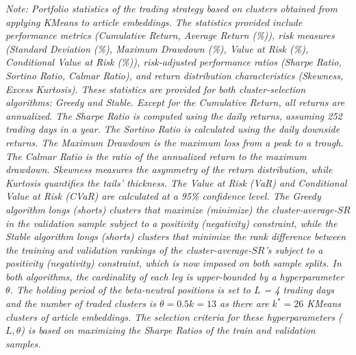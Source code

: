 \begin{table}[H]
\begin{minipage}{\textwidth}
\small\textit{Note: 
Portfolio statistics of the trading strategy based on clusters obtained from applying KMeans to article embeddings. 
The statistics provided include performance metrics (Cumulative Return, Average Return (\%)), risk measures (Standard Deviation (\%), Maximum Drawdown (\%), Value at Risk (\%), Conditional Value at Risk (\%)), risk-adjusted performance ratios (Sharpe Ratio, Sortino Ratio, Calmar Ratio), and return distribution characteristics (Skewness, Excess Kurtosis). These statistics are provided for both cluster-selection algorithms: Greedy and Stable. 
Except for the Cumulative Return, all returns are annualized. The Sharpe Ratio is computed using the daily returns, assuming 252 trading days in a year. The Sortino Ratio is calculated using the daily downside returns. The Maximum Drawdown is the maximum loss from a peak to a trough. The Calmar Ratio is the ratio of the annualized return to the maximum drawdown. Skewness measures the asymmetry of the return distribution, while Kurtosis quantifies the tails' thickness. The Value at Risk (VaR) and Conditional Value at Risk (CVaR) are calculated at a 95\% confidence level.
The Greedy algorithm longs (shorts) clusters that maximize (minimize) the cluster-average-$SR$ in the validation sample subject to a positivity (negativity) constraint, while the Stable algorithm longs (shorts) clusters that minimize the rank difference between the training and validation rankings of the cluster-average-$SR$'s subject to a positivity (negativity) constraint, which is now imposed on both sample splits. In both algorithms, the cardinality of each leg is upper-bounded by a hyperparameter $\theta$. 
The holding period of the beta-neutral positions is set to $L$ = 4 trading days and the number of traded clusters is $\theta = 0.5k=13$ as there are $k^*=26$ KMeans clusters of article embeddings. The selection criteria for these hyperparameters ($L,\theta$) is based on maximizing the Sharpe Ratios of the train and validation samples.
}
\end{minipage}
\end{table}
